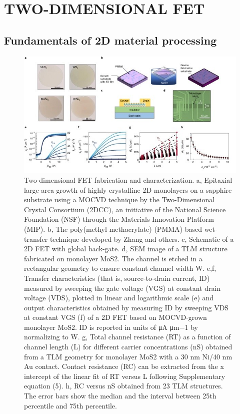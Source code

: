 \documentclass[12pt,a4paper]{report}
\begin{document}
\chapter{TWO-DIMENSIONAL FET}
\section{Fundamentals of 2D material processing}
\begin{figure}
  \centering
  \includegraphics[scale=1]{twodimensionalfet.jpg}
  \caption{Two-dimensional FET fabrication and characterization. a, Epitaxial large-area growth of highly crystalline 2D monolayers on a sapphire substrate using a MOCVD technique by the Two-Dimensional Crystal Consortium (2DCC), an initiative of the National Science Foundation (NSF) through the Materials Innovation Platform (MIP). b, The poly(methyl methacrylate) (PMMA)-based wet-transfer technique developed by Zhang and others. c, Schematic of a 2D FET with global back-gate. d, SEM image of a TLM structure fabricated on monolayer MoS2. The channel is etched in a rectangular geometry to ensure constant channel width W. e,f, Transfer characteristics (that is, source-to-drain current, ID) measured by sweeping the gate voltage (VGS) at constant drain voltage (VDS), plotted in linear and logarithmic scale (e) and output characteristics obtained by measuring ID by sweeping VDS at
  constant VGS (f) of a 2D FET based on MOCVD-grown monolayer MoS2. ID is reported in units of μA μm−1 by normalizing to W. g, Total channel resistance (RT) as a function of channel length (L) for different carrier concentrations (nS) obtained from a TLM geometry for monolayer MoS2 with a 30 nm Ni/40 nm Au contact. Contact resistance (RC) can be extracted from the x intercept of the linear fit of RT versus L following Supplementary equation (5). h, RC versus nS obtained from 23 TLM structures. The error bars show the median and the interval between 25th percentile and 75th percentile. }
  \label{tdf}
  \end{figure}
\end{document}
